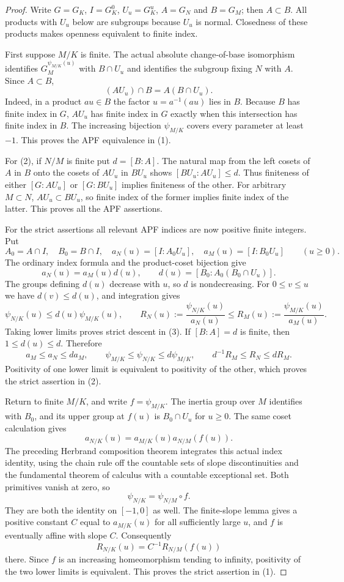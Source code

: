 \begin{proof}
Write $G=G_K$, $I=G_K^0$, $U_u=G_K^u$, $A=G_N$ and $B=G_M$;
then $A\subset B$. All products with $U_u$ below are subgroups because
$U_u$ is normal. Closedness of these products makes openness equivalent
to finite index.

First suppose $M/K$ is finite. The actual absolute change-of-base
isomorphism identifies $G_M^{\psi_{M/K}(u)}$ with $B\cap U_u$ and
identifies the subgroup fixing $N$ with $A$. Since $A\subset B$,
\[
 (AU_u)\cap B=A(B\cap U_u).
\]
Indeed, in a product $au\in B$ the factor $u=a^{-1}(au)$ lies in $B$.
Because $B$ has finite index in $G$, $AU_u$ has finite index in $G$
exactly when this intersection has finite index in $B$. The increasing
bijection $\psi_{M/K}$ covers every parameter at least $-1$. This proves
the APF equivalence in (1).

For (2), if $N/M$ is finite put $d=[B:A]$. The natural map from the
left cosets of $A$ in $B$ onto the cosets of $AU_u$ in $BU_u$ shows
$[BU_u:AU_u]\leq d$. Thus finiteness of either $[G:AU_u]$ or
$[G:BU_u]$ implies finiteness of the other. For arbitrary $M\subset N$,
$AU_u\subset BU_u$, so finite index of the former implies finite index
of the latter. This proves all the APF assertions.

For the strict assertions all relevant APF indices are now positive
finite integers. Put
\[
 A_0=A\cap I,\quad B_0=B\cap I,\quad
 a_N(u)=[I:A_0U_u],\quad a_M(u)=[I:B_0U_u]\qquad(u\geq0).
\]
The ordinary index formula and the product-coset bijection give
\[
 a_N(u)=a_M(u)d(u),\qquad
 d(u)=[B_0:A_0(B_0\cap U_u)].
\]
The groups defining $d(u)$ decrease with $u$, so $d$ is nondecreasing.
For $0\leq v\leq u$ we have $d(v)\leq d(u)$, and integration gives
\[
 \psi_{N/K}(u)\leq d(u)\psi_{M/K}(u),\qquad
 R_N(u):=\frac{\psi_{N/K}(u)}{a_N(u)}
 \leq R_M(u):=\frac{\psi_{M/K}(u)}{a_M(u)}.
\]
Taking lower limits proves strict descent in (3). If $[B:A]=d$ is
finite, then $1\leq d(u)\leq d$. Therefore
\[
 a_M\leq a_N\leq da_M,\qquad
 \psi_{M/K}\leq\psi_{N/K}\leq d\psi_{M/K},\qquad
 d^{-1}R_M\leq R_N\leq dR_M.
\]
Positivity of one lower limit is equivalent to positivity of the other,
which proves the strict assertion in (2).

Return to finite $M/K$, and write $f=\psi_{M/K}$. The inertia group
over $M$ identifies with $B_0$, and its upper group at $f(u)$ is
$B_0\cap U_u$ for $u\geq0$. The same coset calculation gives
\[
 a_{N/K}(u)=a_{M/K}(u)a_{N/M}(f(u)).
\]
The preceding Herbrand composition theorem integrates this actual index
identity, using the chain rule off the countable sets of slope
discontinuities and the fundamental theorem of calculus with a
countable exceptional set. Both primitives vanish at zero, so
\[
 \psi_{N/K}=\psi_{N/M}\circ f.
\]
They are both the identity on $[-1,0]$ as well.
The finite-slope lemma gives a positive constant $C$ equal to
$a_{M/K}(u)$ for all sufficiently large $u$, and $f$ is eventually
affine with slope $C$. Consequently
\[
 R_{N/K}(u)=C^{-1}R_{N/M}(f(u))
\]
there. Since $f$ is an increasing homeomorphism tending to infinity,
positivity of the two lower limits is equivalent. This proves the
strict assertion in (1).


\end{proof}
